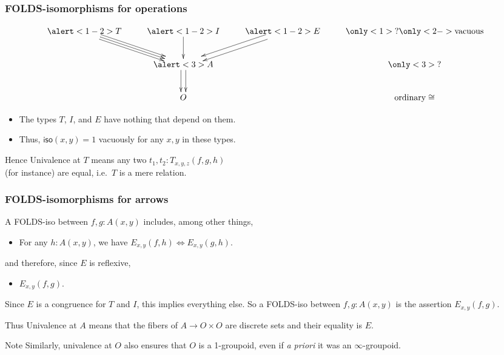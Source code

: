 \documentclass{beamer}
\begin{document}
\begin{frame}
  \frametitle{FOLDS-isomorphisms for operations}
  \[
  \vcenter{\xymatrix{
      \alert<1-2>{T} \ar[dr] \ar@<1mm>[dr] \ar@<-1mm>[dr] & \alert<1-2>{I} \ar[d] & \alert<1-2>{E} \ar@<1mm>[dl] \ar@<-1mm>[dl] &
      \only<1>{?}\only<2->{\text{vacuous}}\\
      & \alert<3>{A} \ar@<1mm>[d] \ar@<-1mm>[d] && \only<3>{?} \\
      & {O}&& \text{ordinary} \cong}}
  \]
  \pause
  \begin{itemize}
  \item The types $T$, $I$, and $E$ have \alert<2>{nothing} that depend on them.
  \item Thus, $\mathsf{iso}(x,y)=1$ vacuously for any $x,y$ in these types.
  \end{itemize}
  \begin{block}{Hence}
    Univalence at $T$ means any two $t_1,t_2 : T_{x,y,z}(f,g,h)$\\ (for instance) are equal, i.e.\ $T$ is a mere relation.
  \end{block}
\end{frame}

\begin{frame}
  \frametitle{FOLDS-isomorphisms for arrows}
  A FOLDS-iso between $f,g:A(x,y)$ includes, among other things,
  \begin{itemize}
  \item For any $h:A(x,y)$, we have $E_{x,y}(f,h) \iff E_{x,y}(g,h)$.
  \end{itemize}
  and therefore, since $E$ is reflexive,
  \begin{itemize}
  \item $E_{x,y}(f,g)$.
  \end{itemize}
  \pause
  Since $E$ is a congruence for $T$ and $I$, this implies everything else.
  So \alert{a FOLDS-iso between $f,g:A(x,y)$ is the assertion $E_{x,y}(f,g)$.}
  \begin{block}{Thus}
    Univalence at $A$ means that the fibers of $A\to O\times O$ are discrete sets and their equality is $E$.
  \end{block}
  \pause
  \begin{block}{Note}
    Similarly, univalence at $O$ also ensures that $O$ is a 1-groupoid, even if \textit{a priori} it was an $\infty$-groupoid.
  \end{block}
\end{frame}
\end{document}
